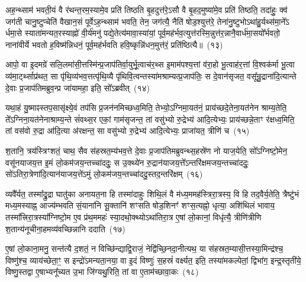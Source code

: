 अह॒न्थ्साम॑ भवती॒यं वै र॑थन्त॒रम॒स्यामे॒व प्रति॑ तिष्ठति बृ॒हदुत्त॑रे॒\-ऽसौ वै बृ॒हद॒मुष्या॑मे॒व प्रति॑ तिष्ठति॒ तदा॑हुः॒ क्व॑ जग॑ती चानु॒ष्टुप्चेति॑ वैखान॒सं पूर्वे\-ऽह॒न्थ्साम॑ भवति॒ तेन॒ जग॑त्यै॒ नैति॑ षोड॒श्युत्त॑रे॒ तेना॑नु॒ष्टुभो\-ऽथा॑हु॒र्यथ्स॑मा॒ने᳚\-ऽ र्धमा॒से स्याता॑मन्यत॒रस्याह्नो॑ वी॒र्य॑मनु॑ पद्ये॒तेत्य॑मावा॒स्या॑यां॒ पूर्व॒मह॑र्भव॒त्युत्त॑रस्मि॒न्नुत्त॑र॒न्नानै॒वार्ध॑मा॒सयो᳚र्भवतो॒ नाना॑वीर्ये भवतो ह॒विष्म॑न्निधनं॒ पूर्व॒मह॑र्भवति हवि॒ष्कृन्नि॑धन॒मुत्त॑रं॒ प्रति॑ष्ठित्यै॥~(१३)

{}%

आपो॒ वा इ॒दमग्रे॑ सलि॒लमा॑सी॒त्तस्मि॑न्प्र॒जा\-प॑तिर्वा॒युर्भू॒त्वाच॑र॒थ्स इ॒माम॑पश्य॒त्तां व॑रा॒हो भू॒त्वाह॑र॒त्तां वि॒श्वक॑र्मा भू॒त्वा व्य॑मा॒र्ट्थ्साप्र॑थत॒ सा पृ॑थि॒व्य॑भव॒त्तत्पृ॑थि॒व्यै पृ॑थिवि॒त्वन्तस्या॑मश्राम्यत्प्र॒जा\-प॑तिः॒ स दे॒वान॑सृजत॒ वसू᳚न्रु॒द्राना॑दि॒त्यान्ते दे॒वाः प्र॒जा\-प॑तिमब्रुव॒न्प्र जा॑यामहा॒ इति॒ सो᳚\-ऽब्रवीत्~(१४)

यथा॒हं यु॒ष्माꣴस्तप॒सासृ॑क्ष्ये॒वं तप॑सि प्र॒जन॑नमिच्छध्व॒मिति॒ तेभ्यो॒\-ऽग्निमा॒यत॑नं॒ प्राय॑च्छदे॒तेना॒यत॑नेन श्राम्य॒तेति॒ ते᳚\-ऽग्निना॒यत॑नेनाश्राम्य॒न्ते सं॑वथ्स॒र एकां॒ गाम॑सृजन्त॒ तां वसु॑भ्यो रु॒द्रेभ्य॑ आदि॒त्येभ्यः॒ प्राय॑च्छन्ने॒ताꣳ र॑क्षध्व॒मिति॒ तां वस॑वो रु॒द्रा आ॑दि॒त्या अ॑रक्षन्त॒ सा वसु॑भ्यो रु॒द्रेभ्य॑ आदि॒त्येभ्यः॒ प्राजा॑यत॒ त्रीणि॑ च~(१५)

श॒तानि॒ त्रय॑स्त्रिꣳशतं॒ चाथ॒ सैव स॑हस्रत॒म्य॑भव॒त्ते दे॒वाः प्र॒जा\-प॑तिमब्रुवन्थ्स॒हस्रे॑ण नो याज॒येति॒ सो᳚\-ऽग्निष्टो॒मेन॒ वसू॑नयाजय॒त्त इ॒मं लो॒कम॑जय॒न्तच्चा॑ददुः॒ स उ॒क्थ्ये॑न रु॒द्रान॑याजय॒त्ते᳚\-ऽन्तरि॑क्षमजय॒न्तच्चा॑ददुः॒ सो॑\-ऽतिरा॒त्रेणा॑\-दि॒त्यान॑याजय॒त्ते॑\-ऽमुं लो॒कम॑जय॒न्तच्चा॑ददु॒स्तद॒न्तरि॑क्षम्~(१६)

व्यवै᳚र्यत॒ तस्मा᳚द्रु॒द्रा घातु॑का अनायत॒ना हि तस्मा॑दाहुः शिथि॒लं वै म॑ध्य॒ममह॑स्त्रिरा॒त्रस्य॒ वि हि तद॒वैर्य॒तेति॒ त्रैष्टु॑भं मध्य॒मस्याह्न॒ आज्य॑म्भवति सं॒याना॑नि सू॒क्तानि॑ शꣳसति षोड॒शिनꣳ॑ शꣳस॒त्यह्नो॒ धृत्या॒ अशि॑थिलं भावाय॒ तस्मा᳚त्त्रिरा॒त्रस्या᳚ग्निष्टो॒म ए॒व प्र॑थ॒ममहः॑ स्या॒दथो॒क्थ्यो\-ऽथा॑तिरा॒त्र ए॒षां लो॒कानां॒ विधृ॑त्यै॒ त्रीणि॑त्रीणि श॒तान्य॑नूचीना॒हमव्य॑वच्छिन्नानि ददाति~(१७)

ए॒षां लो॒काना॒मनु॒ सन्त॑त्यै द॒शतं॒ न विच्छि॑न्द्याद्वि॒राजं॒ नेद्वि॑च्छि॒नदा॒नीत्यथ॒ या स॑हस्रत॒म्यासी॒त्तस्या॒मिन्द्र॑श्च॒ विष्णु॑श्च॒ व्याय॑च्छेता॒ꣳ॒ स इन्द्रो॑\-ऽमन्यता॒नया॒ वा इ॒दं विष्णुः॑ स॒हस्रं॑ वर्क्ष्यत॒ इति॒ तस्या॑मकल्पेतां॒ द्विभा॑ग॒ इन्द्र॒स्तृती॑ये॒ विष्णु॒स्तद्वा ए॒षाभ्यनू᳚च्यत उ॒भा जि॑ग्यथु॒रिति॒ तां वा ए॒ताम॑च्छावा॒कः~(१८)

